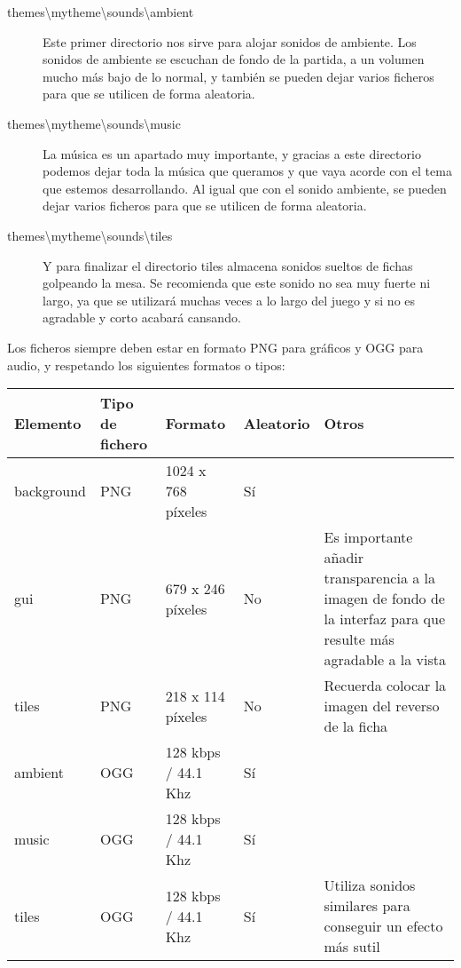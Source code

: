 \begin{description}
                \item[themes\textbackslash{}mytheme\textbackslash{}sounds\textbackslash{}ambient] Este primer directorio nos sirve para alojar sonidos de ambiente. Los sonidos de ambiente
                    se escuchan de fondo de la partida, a un volumen mucho más bajo de lo normal, y también se pueden
                    dejar varios ficheros para que se utilicen de forma aleatoria.
                \item[themes\textbackslash{}mytheme\textbackslash{}sounds\textbackslash{}music] La música es un apartado muy importante, y gracias a este directorio podemos dejar toda
                    la música que queramos y que vaya acorde con el tema que estemos desarrollando. Al igual que con el
                    sonido ambiente, se pueden dejar varios ficheros para que se utilicen de forma aleatoria.
                \item[themes\textbackslash{}mytheme\textbackslash{}sounds\textbackslash{}tiles] Y para finalizar el directorio tiles almacena sonidos sueltos de fichas golpeando la mesa.
                    Se recomienda que este sonido no sea muy fuerte ni largo, ya que se utilizará muchas veces a lo largo
                    del juego y si no es agradable y corto acabará cansando.
\end{description}

Los ficheros siempre deben estar en formato PNG para gráficos y OGG para audio, y respetando los siguientes formatos o tipos:

\begin{center}
    \begin{tabular}{ | l | l | l | l | p{5cm} |}
    \hline
    Elemento & Tipo de fichero & Formato & Aleatorio & Otros \\ \hline
    background & PNG & 1024 x 768 píxeles & Sí &  \\ \hline
    gui & PNG & 679 x 246 píxeles & No & Es importante añadir transparencia a la imagen de fondo de la interfaz 
    para que resulte más agradable a la vista \\ \hline
    tiles & PNG & 218 x 114 píxeles & No & Recuerda colocar la imagen del reverso de la ficha \\ \hline
    ambient & OGG & 128 kbps / 44.1 Khz & Sí &  \\ \hline
    music & OGG & 128 kbps / 44.1 Khz & Sí &  \\ \hline
    tiles & OGG & 128 kbps / 44.1 Khz & Sí & Utiliza sonidos similares para conseguir un efecto más sutil \\ \hline
    \hline
    \end{tabular}
\end{center}

